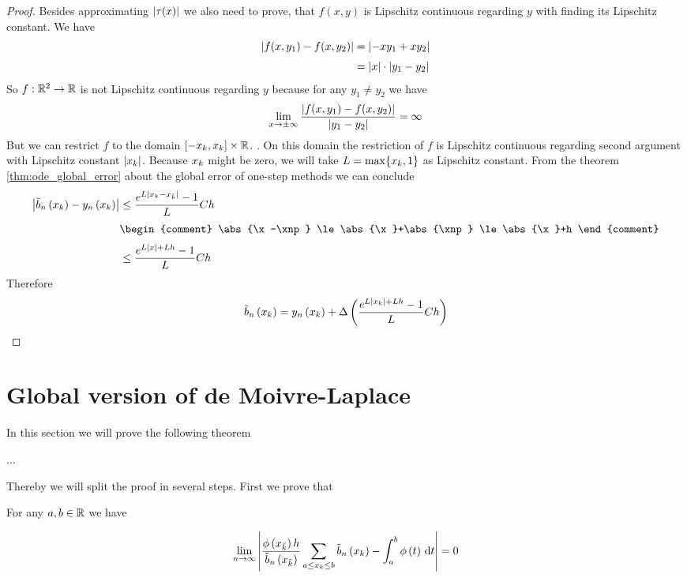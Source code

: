 \begin{proof}
  Besides approximating $\left|{\tau(x)}\right|$ we also need to prove, that $f(x,y)$ is Lipschitz continuous regarding $y$ with finding its Lipschitz constant. We have
  \begin{align}
    \abs{f(x,y_1)-f(x,y_2)} &= \abs{-xy_1+xy_2} \nl
    &= \abs{x} \cdot \abs{y_1-y_2}
  \end{align}
  So $f:\mathbb R^2\to\mathbb R$ is not Lipschitz continuous regarding $y$ because for any $y_1\neq y_2$ we have
  \begin{align}
    \lim_{x\to\pm\infty} \frac{\left|{f(x,y_1)-f(x,y_2)}\right|}{\left|{y_1-y_2}\right|} = \infty
  \end{align}
  But we can restrict $f$ to the domain $\left[{-x_{k}},{x_{k}}\right]\times \mathbb R$. . On this domain the restriction of $f$ is Lipschitz continuous regarding second argument with Lipschitz constant $\left|{x_{k}}\right|$. Because $x_{k}$ might be zero, we will take $L=\max\{x_{k},1\}$ as Lipschitz constant. From the theorem \ref{thm:ode_global_error} about the global error of one-step methods we can conclude
  \begin{align}
    \abs{\bb{\x}-\phin{\x}} &\le \frac{\fe{L\abs{\x-\xnp}}-1}L Ch \nl
    &
    \begin{comment}
      \abs{\x-\xnp} \le \abs{\x}+\abs{\xnp} \le \abs{\x}+h
    \end{comment} \nl
    &\le \frac{\fe{L\abs{x}+Lh}-1}L Ch
  \end{align}
  Therefore
  \begin{align}
    \tilde b_{n}\left({x_{k}}\right) = y_{n}\left({x_{k}}\right) + \Delta\left( {\frac{e^{L\left|{x_{k}}\right|+Lh}-1}L Ch} \right)
  \end{align}
\end{proof}


\section{Global version of de Moivre-Laplace}

In this section we will prove the following theorem

\begin{theorem}
  ...
\end{theorem}

\noindent Thereby we will split the proof in several steps. First we prove that

\begin{lemma}
  For any $a,b \in \mathbb R$ we have

  \begin{align}
    \lim_{n\to\infty} \left|{\frac{\phi\left( {x_{\tilde k}} \right)h}{\tilde b_{n}\left({x_{\tilde k}}\right)} \sum_{a\le x_{k}\le b} \tilde b_{n}\left({x_{k}}\right) - \int_a^b \phi\left( {t} \right)\,\mathrm d{t}}\right| = 0
  \end{align}
\end{lemma}

